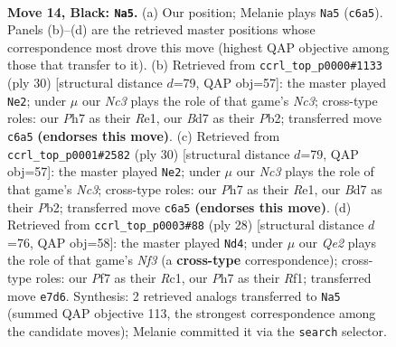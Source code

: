 \documentclass[11pt]{article}
\begin{document}
\clearpage

\begin{figure}[p]\centering
\begin{subfigure}{0.46\textwidth}\centering
\resizebox{\linewidth}{!}{%
\newchessgame
\chessboard[
  setfen={rr4k1/p1pbqppp/1pn1pn2/8/2BPP2P/5NP1/PP1B1P2/R2QR1K1 b - - 0 14},
  showmover=false,
  pgfstyle=straightmove, color=movearrow, markmove={c6-a5}
]}
\caption{}
\end{subfigure}\hfill
\begin{subfigure}{0.46\textwidth}\centering
\resizebox{\linewidth}{!}{%
\newchessgame
\chessboard[
  setfen={r1bq1rk1/4n2p/p2p1pp1/1ppP4/4P3/1QN2N2/PP3PPP/R3R1K1 w - - 0 16},
  showmover=false,
  pgfstyle=straightmove, color=movearrow, markmove={c3-e2}
]}
\caption{}
\end{subfigure}
\\[4pt]
\begin{subfigure}{0.46\textwidth}\centering
\resizebox{\linewidth}{!}{%
\newchessgame
\chessboard[
  setfen={r1bq1rk1/4n2p/p2p1pp1/1ppP4/4P3/1QN2N2/PP3PPP/R3R1K1 w - - 0 16},
  showmover=false,
  pgfstyle=straightmove, color=movearrow, markmove={c3-e2}
]}
\caption{}
\end{subfigure}\hfill
\begin{subfigure}{0.46\textwidth}\centering
\resizebox{\linewidth}{!}{%
\newchessgame
\chessboard[
  setfen={rqb2rk1/3n1p1p/p2bpp2/1p6/4P3/1BN2N2/PP2QPPP/2R2RK1 w - - 0 15},
  showmover=false,
  pgfstyle=straightmove, color=movearrow, markmove={f3-d4}
]}
\caption{}
\end{subfigure}
\caption{\textbf{Move 14, Black: \texttt{Na5}.} (a) Our position; Melanie plays \texttt{Na5} (\texttt{c6a5}). Panels (b)--(d) are the retrieved master positions whose correspondence most drove this move (highest QAP objective among those that transfer to it). (b) Retrieved from \texttt{ccrl\_top\_p0000\#1133} (ply 30) [structural distance $d$=79, QAP obj=57]: the master played \texttt{Ne2}; under $\mu$ our \emph{Nc3} plays the role of that game's \emph{Nc3}; cross-type roles: our \emph{P}h7 as their \emph{R}e1, our \emph{B}d7 as their \emph{P}b2; transferred move \texttt{c6a5} \textbf{(endorses this move)}. (c) Retrieved from \texttt{ccrl\_top\_p0001\#2582} (ply 30) [structural distance $d$=79, QAP obj=57]: the master played \texttt{Ne2}; under $\mu$ our \emph{Nc3} plays the role of that game's \emph{Nc3}; cross-type roles: our \emph{P}h7 as their \emph{R}e1, our \emph{B}d7 as their \emph{P}b2; transferred move \texttt{c6a5} \textbf{(endorses this move)}. (d) Retrieved from \texttt{ccrl\_top\_p0003\#88} (ply 28) [structural distance $d$=76, QAP obj=58]: the master played \texttt{Nd4}; under $\mu$ our \emph{Qe2} plays the role of that game's \emph{Nf3} (a \textbf{cross-type} correspondence); cross-type roles: our \emph{P}f7 as their \emph{R}c1, our \emph{P}h7 as their \emph{R}f1; transferred move \texttt{e7d6}. Synthesis: 2 retrieved analogs transferred to \texttt{Na5} (summed QAP objective 113, the strongest correspondence among the candidate moves); Melanie committed it via the \texttt{search} selector.}
\label{fig:thought-m27}
\end{figure}
\end{document}
